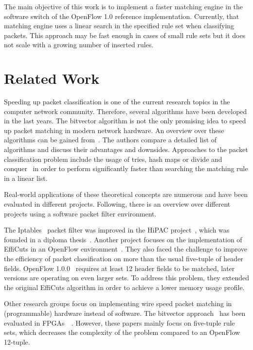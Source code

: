 \documentclass[a4paper,
		12pt,
		parskip=full,
		titlepage
		]{scrartcl}
\begin{document}
The main objective of this work is to implement a faster matching engine in the software switch of the OpenFlow 1.0 reference implementation.
Currently, that matching engine uses a linear search in the specified rule set when classifying packets.
This approach may be fast enough in cases of small rule sets but it does not scale
with a growing number of inserted rules.

\section{Related Work}
Speeding up packet classification is one of the current research topics in the computer network community.
Therefore, several algorithms have been developed in the last years.
The bitvector algorithm is not the only promising idea to speed up packet matching in modern network hardware.
An overview over these algorithms can be gained from~\cite{algorithms_survey}.
The authors compare a detailed list of algorithms and discuss their advantages and downsides.
Approaches to the packet classification problem include the usage of tries, 
hash maps or divide and conquer~\cite{hicuts} in order to perform significantly 
faster than searching the matching rule in a linear list.

Real-world applications of these theoretical concepts are numerous and have been evaluated in different projects.
Following, there is an overview over different projects using a software packet filter environment.

The Iptables~\cite{iptables} packet filter was improved in the HiPAC project~\cite{hipac}, which was founded in a diploma thesis~\cite{heinzhigh}.
Another project focuses on the implementation of EffiCuts in an OpenFlow environment~\cite{stimpfling2013optimal}.
They also faced the challenge to improve the efficiency of packet classification on more than the usual five-tuple of header fields.
OpenFlow 1.0.0~\cite{openflow_spec10} requires at least 12 header fields to be matched, later versions are operating on even larger sets.
To address this problem, they extended the original EffiCuts algorithm in order to achieve a lower memory usage profile.

Other research groups focus on implementing wire speed packet matching in (programmable) hardware instead of software.
The bitvector approach~\cite{bv} has been evaluated in FPGAs~\cite{bitvector_fpga}~\cite{qu2013fast}.
However, these papers mainly focus on five-tuple rule sets, which decreases the complexity of the problem compared to an OpenFlow 12-tuple.
\end{document}
